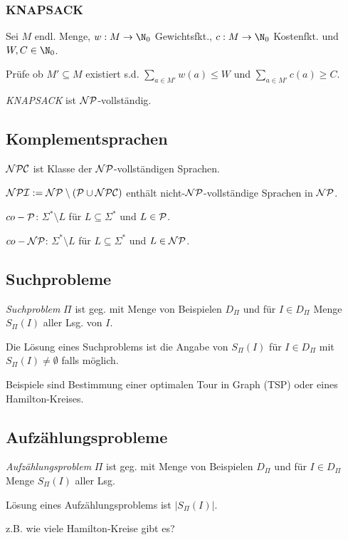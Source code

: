 \subsubsection*{KNAPSACK}

Sei $M$ endl. Menge, $w : M \to \N_0$ Gewichtsfkt., $c : M \to \N_0$ Kostenfkt. und $W,C \in \N_0$.

Prüfe ob $M' \subseteq M$ existiert s.d. $\sum_{a \in M'} w(a) \leq W$ und $\sum_{a \in M'} c(a) \geq C$.

\emph{KNAPSACK} ist $\NP$-vollständig.

\subsection*{Komplementsprachen}

$\NPC$ ist Klasse der $\NP$-vollständigen Sprachen.

$\NPI := \NP \setminus (\P \cup \NPC)$ enthält nicht-$\NP$-vollständige Sprachen in $\NP$.

$co-\P$: $\Sigma^* \setminus L$ für $L \subseteq \Sigma^*$ und $L \in \P$.

$co-\NP$: $\Sigma^* \setminus L$ für $L \subseteq \Sigma^*$ und $L \in \NP$.


\subsection*{Suchprobleme}

\emph{Suchproblem} $\Pi$ ist geg. mit Menge von Beispielen $D_\Pi$ und für $I \in D_\Pi$ Menge $S_\Pi(I)$ aller Lsg. von $I$.

Die Lösung eines Suchproblems ist die Angabe von $S_\Pi(I)$ für $I \in D_\Pi$ mit $S_\Pi(I) \neq \emptyset$ falls möglich.

\spacing

Beispiele sind Bestimmung einer optimalen Tour in Graph (TSP) oder eines Hamilton-Kreises.

\subsection*{Aufzählungsprobleme}

\emph{Aufzählungsproblem} $\Pi$ ist geg. mit Menge von Beispielen $D_\Pi$ und für $I \in D_\Pi$ Menge $S_\Pi(I)$ aller Lsg.

Lösung eines Aufzählungsproblems ist $|S_\Pi(I)|$.

\spacing

z.B. wie viele Hamilton-Kreise gibt es?

